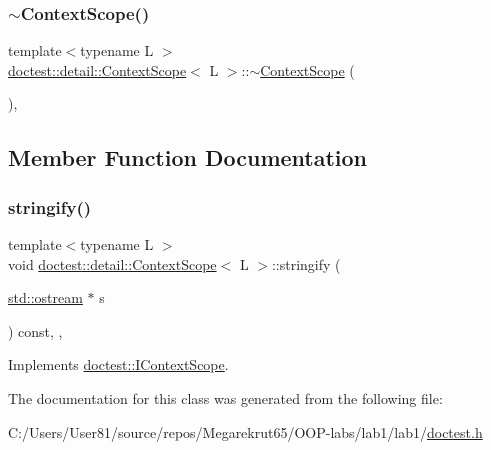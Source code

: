 \subsubsection{\texorpdfstring{$\sim$\+Context\+Scope()}{~ContextScope()}}
{\footnotesize\ttfamily template$<$typename L $>$ \\
\mbox{\hyperlink{classdoctest_1_1detail_1_1_context_scope}{doctest\+::detail\+::\+Context\+Scope}}$<$ L $>$\+::$\sim$\mbox{\hyperlink{classdoctest_1_1detail_1_1_context_scope}{Context\+Scope}} (\begin{DoxyParamCaption}{ }\end{DoxyParamCaption})\hspace{0.3cm}{\ttfamily [inline]}, {\ttfamily [override]}}



\subsection{Member Function Documentation}
\mbox{\label{classdoctest_1_1detail_1_1_context_scope_a4636ac32ae41ae108c7ada4a164ffaeb}} 
\subsubsection{\texorpdfstring{stringify()}{stringify()}}
{\footnotesize\ttfamily template$<$typename L $>$ \\
void \mbox{\hyperlink{classdoctest_1_1detail_1_1_context_scope}{doctest\+::detail\+::\+Context\+Scope}}$<$ L $>$\+::stringify (\begin{DoxyParamCaption}\item[{\mbox{\hyperlink{doctest_8h_a116af65cb5e924b33ad9d9ecd7a783f3}{std\+::ostream}} $\ast$}]{s }\end{DoxyParamCaption}) const\hspace{0.3cm}{\ttfamily [inline]}, {\ttfamily [override]}, {\ttfamily [virtual]}}



Implements \mbox{\hyperlink{structdoctest_1_1_i_context_scope_affbf0f9bf8107a4a8a805d237288141d}{doctest\+::\+I\+Context\+Scope}}.



The documentation for this class was generated from the following file\+:\begin{DoxyCompactItemize}
\item 
C\+:/\+Users/\+User81/source/repos/\+Megarekrut65/\+O\+O\+P-\/labs/lab1/lab1/\mbox{\hyperlink{doctest_8h}{doctest.\+h}}\end{DoxyCompactItemize}
